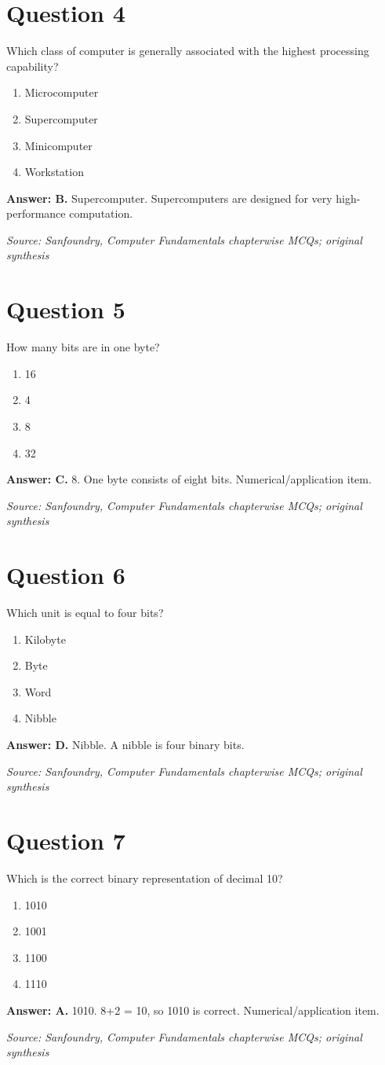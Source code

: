 \documentclass[11pt,a4paper]{book}
\newcommand{\source}[1]{\par\smallskip\textit{Source: #1}}
\newcommand{\answer}[2]{\par\textbf{Answer: #1.} #2}
\begin{document}
\section*{Question 4}
Which class of computer is generally associated with the highest processing capability?
\begin{enumerate}[label=\Alph*.]
\item Microcomputer
\item Supercomputer
\item Minicomputer
\item Workstation
\end{enumerate}
\answer{B}{Supercomputer. Supercomputers are designed for very high-performance computation.}
\source{Sanfoundry, Computer Fundamentals chapterwise MCQs; original synthesis}
\section*{Question 5}
How many bits are in one byte?
\begin{enumerate}[label=\Alph*.]
\item 16
\item 4
\item 8
\item 32
\end{enumerate}
\answer{C}{8. One byte consists of eight bits. Numerical/application item.}
\source{Sanfoundry, Computer Fundamentals chapterwise MCQs; original synthesis}
\section*{Question 6}
Which unit is equal to four bits?
\begin{enumerate}[label=\Alph*.]
\item Kilobyte
\item Byte
\item Word
\item Nibble
\end{enumerate}
\answer{D}{Nibble. A nibble is four binary bits.}
\source{Sanfoundry, Computer Fundamentals chapterwise MCQs; original synthesis}
\section*{Question 7}
Which is the correct binary representation of decimal 10?
\begin{enumerate}[label=\Alph*.]
\item 1010
\item 1001
\item 1100
\item 1110
\end{enumerate}
\answer{A}{1010. 8+2 = 10, so 1010 is correct. Numerical/application item.}
\source{Sanfoundry, Computer Fundamentals chapterwise MCQs; original synthesis}
\end{document}
